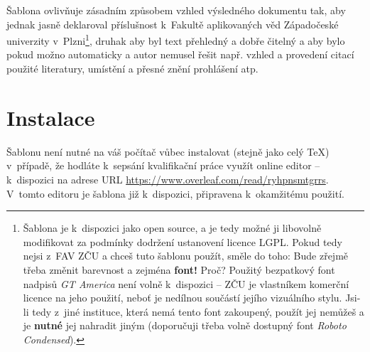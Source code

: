 \documentclass[czech, ma, kiv, he, iso690alph, pdf, viewonly]{fasthesis}
\begin{document}
Šablona ovlivňuje zásadním způsobem vzhled výsledného dokumentu tak, aby jednak jasně deklaroval příslušnost k~Fakultě aplikovaných věd Západočeské univerzity v~Plzni\footnote{Šablona je k~dispozici jako open source, a je tedy možné ji libovolně modifikovat za podmínky dodržení ustanovení licence LGPL. Pokud tedy nejsi z~FAV ZČU a chceš tuto šablonu použít, směle do toho: Bude zřejmě třeba změnit barevnost a zejména \textbf{font!} Proč? Použitý bezpatkový font nadpisů \emph{GT America} není volně k~dispozici -- ZČU je vlastníkem komerční licence na jeho použití, neboť je nedílnou součástí jejího vizuálního stylu. Jsi-li tedy z~jiné instituce, která nemá tento font zakoupený, použít jej nemůžeš a je \textbf{nutné} jej nahradit jiným (doporučuji třeba volně dostupný font \emph{Roboto Condensed}).}, druhak aby byl text přehledný a dobře čitelný a aby bylo pokud možno  automaticky a autor nemusel řešit např. vzhled a provedení citací použité literatury, umístění a přesné znění prohlášení atp.
%
%
%
\section{Instalace}
Šablonu není nutné  na váš počítač vůbec instalovat (stejně jako celý \TeX) v~případě, že hodláte k~sepsání kvalifikační práce využít online editor  -- k~dispozici na adrese URL \url{https://www.overleaf.com/read/ryhpnsmtgrrs}. V~tomto editoru je šablona již k~dispozici, připravena k~okamžitému použití.
\end{document}
